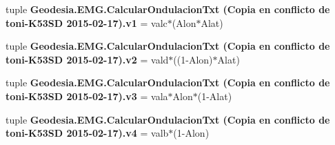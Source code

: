 \begin{DoxyCompactItemize}
tuple {\bf Geodesia.\-E\-M\-G.\-Calcular\-Ondulacion\-Txt (\-Copia en conflicto de toni-\/\-K53\-S\-D 2015-\/02-\/17).\-v1} = valc$\ast$(Alon$\ast$Alat)
\item 
tuple {\bf Geodesia.\-E\-M\-G.\-Calcular\-Ondulacion\-Txt (\-Copia en conflicto de toni-\/\-K53\-S\-D 2015-\/02-\/17).\-v2} = vald$\ast$((1-\/Alon)$\ast$Alat)
\item 
tuple {\bf Geodesia.\-E\-M\-G.\-Calcular\-Ondulacion\-Txt (\-Copia en conflicto de toni-\/\-K53\-S\-D 2015-\/02-\/17).\-v3} = vala$\ast$Alon$\ast$(1-\/Alat)
\item 
tuple {\bf Geodesia.\-E\-M\-G.\-Calcular\-Ondulacion\-Txt (\-Copia en conflicto de toni-\/\-K53\-S\-D 2015-\/02-\/17).\-v4} = valb$\ast$(1-\/Alon)
\end{DoxyCompactItemize}
